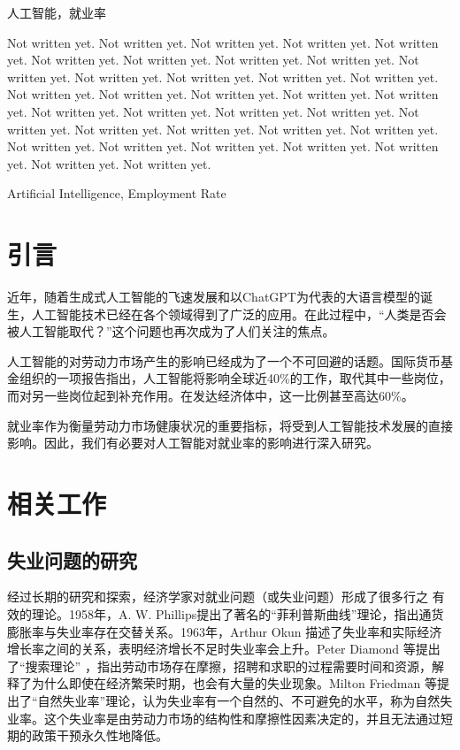\documentclass{article}
\begin{document}
人工智能，就业率

\songti
\vspace{2cm}

%
Not written yet. Not written yet. Not written yet. Not written yet. Not written yet. Not written yet. Not written yet. Not written yet. Not written yet. Not written yet. Not written yet. Not written yet. Not written yet. Not written yet. Not written yet. Not written yet. Not written yet. Not written yet. Not written yet. Not written yet. Not written yet. Not written yet. Not written yet. Not written yet. Not written yet. Not written yet. Not written yet. Not written yet. Not written yet. Not written yet. Not written yet. Not written yet. Not written yet. Not written yet. Not written yet. 

\bigskip
{}%
Artificial Intelligence, Employment Rate

\newpage
{}
\setcounter{page}{1}

\section{引言}

近年，随着生成式人工智能的飞速发展和以ChatGPT为代表的大语言模型的诞生，人工智能技术已经在各个领域得到了广泛的应用。在此过程中，``人类是否会被人工智能取代？''这个问题也再次成为了人们关注的焦点。

人工智能的对劳动力市场产生的影响已经成为了一个不可回避的话题。国际货币基金组织的一项报告\cite{imf2024ai}指出，人工智能将影响全球近40\%的工作，取代其中一些岗位，而对另一些岗位起到补充作用。在发达经济体中，这一比例甚至高达60\%。

就业率作为衡量劳动力市场健康状况的重要指标，将受到人工智能技术发展的直接影响。因此，我们有必要对人工智能对就业率的影响进行深入研究。

\section{相关工作}

\subsection{失业问题的研究}

经过长期的研究和探索，经济学家对就业问题（或失业问题）形成了很多行之
有效的理论。1958年，A. W. Phillips提出了著名的“菲利普斯曲线”理论\cite{phillips1958relation}，指出通货膨胀率与失业率存在交替关系。1963年，Arthur Okun \cite{okun1963potential} 描述了失业率和实际经济增长率之间的关系，表明经济增长不足时失业率会上升。Peter Diamond 等提出了“搜索理论”\cite{diamond1982aggregate} \cite{mortensen1982property}，指出劳动市场存在摩擦，招聘和求职的过程需要时间和资源，解释了为什么即使在经济繁荣时期，也会有大量的失业现象。Milton Friedman 等提出了“自然失业率”理论\cite{friedman1995role}，认为失业率有一个自然的、不可避免的水平，称为自然失业率。这个失业率是由劳动力市场的结构性和摩擦性因素决定的，并且无法通过短期的政策干预永久性地降低。
\end{document}
